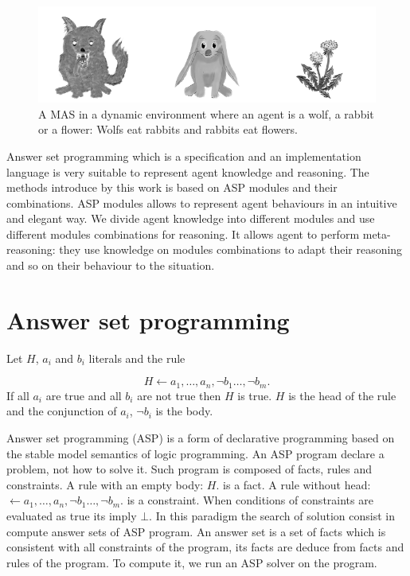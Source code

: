 \documentclass{aamas2012}
\begin{document}
	\begin{figure}
		\centering
		\includegraphics[keepaspectratio=true,scale=3.0]{food_chain.png}
		\caption
		{
			\label{food_chain}
			A MAS in a dynamic environment where an agent is a wolf, a rabbit or a flower:
			Wolfs eat rabbits and rabbits eat flowers.
		}
	\end{figure}
	
	Answer set programming which is a specification and an implementation language is very suitable to represent agent knowledge and reasoning.
	The methods introduce by this work is based on ASP modules and their combinations.
	ASP modules allows to represent agent behaviours in an intuitive and elegant way.
	We divide agent knowledge into different modules and use different modules combinations for reasoning.
	It allows agent to perform meta-reasoning: they use knowledge on modules combinations to adapt their reasoning and so on their behaviour to the situation.

\section{Answer set programming}

	\begin{definition}[Rule]
		Let $H$, $a_{i}$ and $b_{i}$ literals and the rule
	
					$$H \leftarrow a_{1}, \ldots , a_{n}, \neg b_{1} \ldots, \neg b_{m}.$$
		If all $a_{i}$ are true and all $b_{i}$ are not true then $H$ is true.
		$H$ is the head of the rule and the conjunction of $a_{i}$, $\neg b_{i}$ is the body.
	\end{definition}

	Answer set programming (ASP) is a form of declarative programming based on the stable model semantics of logic programming.
	An ASP program declare a problem, not how to solve it.
	Such program is composed of facts, rules and constraints. 
	A rule with an empty body: $H.$ is a fact.
	A rule without head: $\leftarrow a_{1}, \ldots , a_{n}, \neg b_{1} \ldots, \neg b_{m}.$ is a constraint.
	When conditions of constraints are evaluated as true its imply $\bot$.
	In this paradigm the search of solution consist in compute answer sets of ASP program.
	An answer set is a set of facts which is consistent with all constraints of the program, its facts are deduce from facts and rules of the program.
	To compute it, we run an ASP solver on the program.
	
\end{document}
